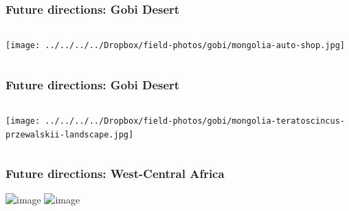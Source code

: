 \begin{frame}
    \frametitle{Future directions: Gobi Desert}
    \vspace{-2mm}
    \begin{columns}
        \column{\dimexpr\paperwidth}
        \texttt{[image: ../../../../Dropbox/field-photos/gobi/mongolia-auto-shop.jpg]}
    \end{columns}
\end{frame}

\begin{frame}
    \frametitle{Future directions: Gobi Desert}
    \vspace{-2mm}
    \begin{columns}
        \column{\dimexpr\paperwidth}
        \texttt{[image: ../../../../Dropbox/field-photos/gobi/mongolia-teratoscincus-przewalskii-landscape.jpg]}
    \end{columns}
\end{frame}

\begin{frame}[t]
    \frametitle{Future directions: West-Central Africa}
    \begin{center}
        \includegraphics<1->[height={3cm}]{../../../../Dropbox/field-photos/africa/Figure2_WAmapForestDist.png}
        \hspace{0.3mm}
        \includegraphics<1->[height={3cm}]{../../../../Dropbox/field-photos/africa/Figure4_herps.jpeg}
    \end{center}


\end{frame}


